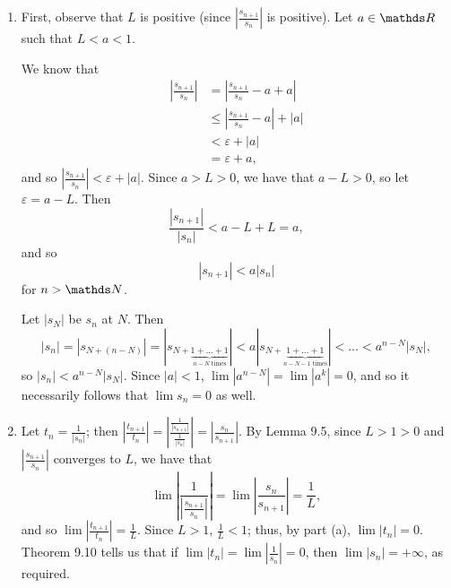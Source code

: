 \documentclass{homework}
\begin{document}
\begin{solution}
  \begin{enumerate}[label=(\alph*)]
    \item First, observe that $L$ is positive (since $\left| \frac{s_{n+1}}{s_n} \right| $ is
      positive). Let $a\in \R$ such that $L<a<1$.

      We know that
      \begin{align*}
        \left| \frac{s_{n+1}}{s_n} \right| &= \left| \frac{s_{n+1}}{s_n} -a+a\right| \\
                                           &\le \left| \frac{s_{n+1}}{s_n}-a \right| +\left| a
                                           \right| \\
                                           &< \varepsilon+\left| a \right| \\
                                           &= \varepsilon+a
     ,\end{align*}
     and so $\left| \frac{s_{n+1}}{s_n} \right| <\varepsilon+\left| a \right| $. Since $a>L>0$, we
     have that $a-L>0$, so let $\varepsilon=a-L$. Then \[
       \frac{\left| s_{n+1} \right| }{\left| s_n \right| } < a-L+L=a
     ,\] and so \[
     \left| s_{n+1} \right| < a\left| s_n \right| 
     \] for $n>\N$.

     Let $\left| s_N \right| $ be $s_n$ at $N$. Then \[
       \left| s_n \right| =\left| s_{N+(n-N)} \right| =\left|
       s_{N+\underbrace{1+\ldots+1}_\text{$n-N$ times}} \right|  < a\left|
       s_{N+\underbrace{1+\ldots+1}_\text{$n-N-1$ times}} \right| <\ldots<a^{n-N}\left| s_N \right| 
     ,\] so $\left| s_n \right| <a^{n-N}\left| s_N \right| $. Since $\left| a \right| <1$,
     $\lim{\left| a^{n-N} \right| }=\lim{\left| a^{k} \right|}=0$, and so it necessarily follows
     that $\lim{s_n}=0$ as well.


   \item Let $t_n=\frac{1}{\left| s_n \right| }$; then $\left| \frac{t_{n+1}}{t_n} \right|=\left|
     \frac{\frac{1}{\left| s_{n+1} \right| }}{\frac{1}{\left| s_n \right| }} \right| =\left|
     \frac{s_n}{s_{n+1}} \right|$. By Lemma 9.5, since $L>1>0$ and $\left| \frac{s_{n+1}}{s_n}
     \right| $ converges to $L$, we have that \[
       \lim{\left| \frac{1}{\left| \frac{s_{n+1}}{s_n} \right|} \right| }=\lim{\left|
       \frac{s_n}{s_{n+1}} \right| }=\frac{1}{L}
     ,\] and so $\lim{\left| \frac{t_{n+1}}{t_n} \right| }=\frac{1}{L}$. Since $L>1$,
     $\frac{1}{L}<1$; thus, by part (a), $\lim{\left| t_n \right| }=0$. Theorem 9.10 tells us that
     if $\lim{\left| t_n \right| }=\lim{\left| \frac{1}{s_n} \right| }=0$, then $\lim{\left| s_n
     \right| }=+\infty$, as required.
  \end{enumerate}
\end{solution}
\end{document}
